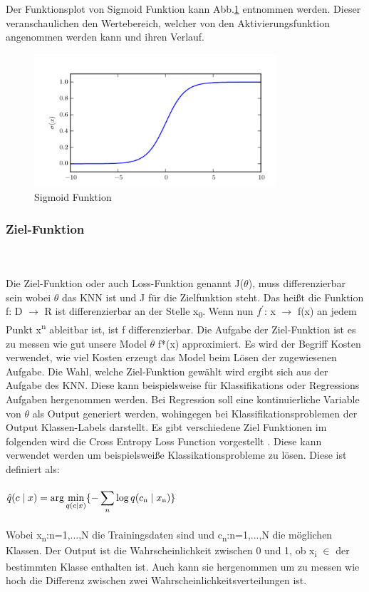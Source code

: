 \documentclass{llncs}
\begin{document}
\vspace{5 mm}
Der Funktionsplot von Sigmoid Funktion kann Abb.\ref{fig:Bild3} entnommen werden. Dieser veranschaulichen den Wertebereich, welcher von den Aktivierungsfunktion angenommen werden kann und ihren Verlauf. 
\begin{figure}[htbp] 
	\centering
	\includegraphics[width=0.8\textwidth]{sigmoid.png}
	\caption{Sigmoid Funktion}
	\label{fig:Bild3}
\end{figure}

\newpage
\subsubsection{Ziel-Funktion}\label{sec:Zielfunktion}
~\\\\
Die Ziel-Funktion oder auch Loss-Funktion genannt J($\theta$), muss differenzierbar sein wobei $\theta$ das KNN ist und J für die Zielfunktion steht. Das heißt die Funktion f: D $\to$ R ist differenzierbar an der Stelle x\textsubscript{0}. Wenn nun $f^\prime$: x $\to$ f(x) an jedem Punkt x\textsuperscript{n} ableitbar ist, ist f differenzierbar. Die Aufgabe der Ziel-Funktion ist es zu messen wie gut unsere Model $\theta$ f*(x) approximiert. Es wird der Begriff Kosten verwendet, wie viel Kosten erzeugt das Model beim Lösen der zugewiesenen Aufgabe. Die Wahl, welche Ziel-Funktion gewählt wird ergibt sich aus der Aufgabe des KNN. Diese kann beispielsweise für Klassifikations oder Regressions Aufgaben hergenommen werden. Bei Regression soll eine kontinuierliche Variable von $\theta$ als Output generiert werden, wohingegen bei Klassifikationsproblemen der Output Klassen-Labels darstellt\cite{Grundlagen}. Es gibt verschiedene Ziel Funktionen im folgenden wird die Cross Entropy Loss Function vorgestellt \cite{crossentropy}. Diese kann verwendet werden um beispielsweiße Klassikationsprobleme zu lösen. Diese ist definiert als:
\\\\
\begin{math}
\hat{q}(c\mid x)=\displaystyle\arg\min_{q(c\mid  x)}\{-\displaystyle\sum_{n}{\log q(c\textsubscript{n}\mid x\textsubscript{n})}\}
\end{math}
\\\\
Wobei  x\textsubscript{n}:n=1,...,N die Trainingsdaten sind und c\textsubscript{n}:n=1,...,N die möglichen Klassen. Der Output ist die Wahrscheinlichkeit zwischen 0 und 1, ob  x\textsubscript{i} $\in$ der bestimmten Klasse enthalten ist. Auch kann sie hergenommen um zu messen wie hoch die Differenz zwischen zwei Wahrscheinlichkeitsverteilungen ist.
\end{document}
